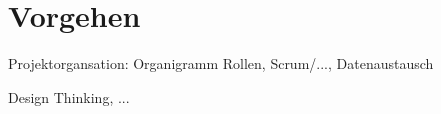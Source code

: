 \section{Vorgehen}

Projektorgansation: Organigramm Rollen, Scrum/..., Datenaustausch

Design Thinking, ...